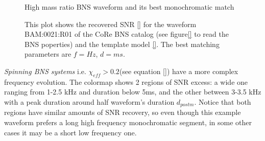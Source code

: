 \begin{figure}[!htbp]
\begin{center}
\begin{minipage}[t]{0.5\linewidth}
\end{minipage}
\captionsetup{width=0.8\textwidth}
\caption{High mass ratio BNS waveform and its best monochromatic match}
\caption*{This plot shows the recovered SNR \ref{} for the waveform BAM:0021:R01 of the CoRe BNS catalog \cite{}(see figure\ref{} to read the BNS poperties) and the template model \ref{}. The best matching parameters are $f=Hz$, $d=ms$.}
\end{center}
\end{figure}

\FloatBarrier


\newpage

\textit{Spinning BNS systems} i.e. $\chi_{eff}>0.2$(see equation \ref{}) have a more complex frequency evolution. The colormap shows 2 regions of SNR excess: a wide one ranging from 1-2.5 kHz and duration below 5ms, and the other between 3-3.5 kHz with a peak duration around half waveform's duration $d_{postm}$. Notice that both regions have similar amounts of SNR recovery, so even though this example waveform prefers a long high frequency monochromatic segment, in some other cases it may be a short low frequency one.

